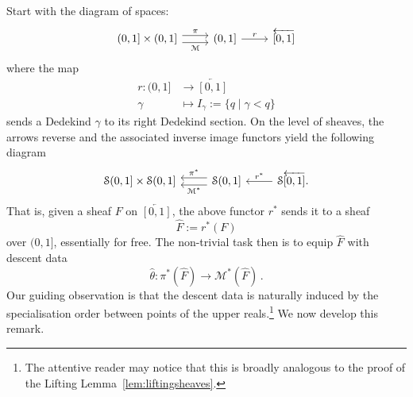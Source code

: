 \documentclass[a4paper, 11pt,reqno]{amsart}
\newcommand{\M}{\mathcal{M}}
\newcommand{\baseS}{\mathcal{S}}
\begin{document}
Start with the diagram of spaces:
\[ \begin{tikzcd}
\protect(0,1]\times \protect(0,1] \ar[r,shift left=.75ex,"\pi"]
\ar[r,shift right=.75ex,swap,"\M"] & \protect(0,1]\ar[r,"r"] & \overleftarrow{\protect[0,1]}\end{tikzcd}\]
where the map
\begin{align}\label{eq:r-map}
r\colon (0,1]&\longrightarrow\overleftarrow{[0,1]}\\
\gamma&\longmapsto I_{\gamma}:=\{q\mid \gamma<q\} \nonumber
\end{align}
 sends a Dedekind $\gamma$ to its right Dedekind section. On the level of sheaves, the arrows reverse and the associated inverse image functors yield the following diagram
\begin{equation}\label{eq:KsetupDIAGRAM}
\begin{tikzcd}
\mathcal{S}(0,1]\times\baseS(0,1] & \mathcal{S}\protect(0,1] \ar[l,shift right=.75ex,swap,"\pi^*"]
\ar[l,shift left =.75ex,"\M^*"] & \mathcal{S}\protect\overleftarrow{[0,1]} \ar[l,swap, "r^*"].\end{tikzcd}
\end{equation}
That is, given a sheaf $F$ on $\overleftarrow{[0,1]}$, the above functor $r^*$ sends it to a sheaf 
\begin{equation}\label{eq:rF}
\widehat{F}:=r^*(F)
\end{equation}
 over $(0,1]$,  essentially for free. The non-trivial task then is to equip  $\widehat{F}$ with descent data
$$\hat{\theta}\colon \pi^*(\widehat{F})\to \M^*(\widehat{F})\,.$$
Our guiding observation is that the descent data is naturally induced by the specialisation order between points of the upper reals.\footnote{The attentive reader may notice that this is broadly analogous to the proof of the Lifting Lemma~\ref{lem:liftingsheaves}.} We now develop this remark. 
\end{document}
